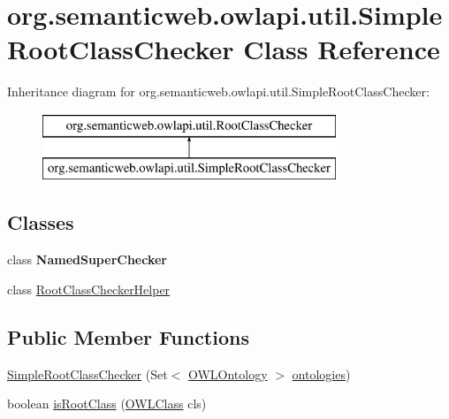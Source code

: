 \hypertarget{classorg_1_1semanticweb_1_1owlapi_1_1util_1_1_simple_root_class_checker}{\section{org.\-semanticweb.\-owlapi.\-util.\-Simple\-Root\-Class\-Checker Class Reference}
\label{classorg_1_1semanticweb_1_1owlapi_1_1util_1_1_simple_root_class_checker}
}
Inheritance diagram for org.\-semanticweb.\-owlapi.\-util.\-Simple\-Root\-Class\-Checker\-:\begin{figure}[H]
\begin{center}
\leavevmode
\includegraphics[height=2.000000cm]{classorg_1_1semanticweb_1_1owlapi_1_1util_1_1_simple_root_class_checker}
\end{center}
\end{figure}
\subsection*{Classes}
\begin{DoxyCompactItemize}
\item 
class {\bfseries Named\-Super\-Checker}
\item 
class \hyperlink{classorg_1_1semanticweb_1_1owlapi_1_1util_1_1_simple_root_class_checker_1_1_root_class_checker_helper}{Root\-Class\-Checker\-Helper}
\end{DoxyCompactItemize}
\subsection*{Public Member Functions}
\begin{DoxyCompactItemize}
\item 
\hyperlink{classorg_1_1semanticweb_1_1owlapi_1_1util_1_1_simple_root_class_checker_a4998321e8199f7e0f962b8a0b88bdc81}{Simple\-Root\-Class\-Checker} (Set$<$ \hyperlink{interfaceorg_1_1semanticweb_1_1owlapi_1_1model_1_1_o_w_l_ontology}{O\-W\-L\-Ontology} $>$ \hyperlink{classorg_1_1semanticweb_1_1owlapi_1_1util_1_1_simple_root_class_checker_a220778209cc9cf5b4aa5a4a303ae79ed}{ontologies})
\item 
boolean \hyperlink{classorg_1_1semanticweb_1_1owlapi_1_1util_1_1_simple_root_class_checker_aaacac662b7b2ae789713f5ffda313991}{is\-Root\-Class} (\hyperlink{interfaceorg_1_1semanticweb_1_1owlapi_1_1model_1_1_o_w_l_class}{O\-W\-L\-Class} cls)
\end{DoxyCompactItemize}
